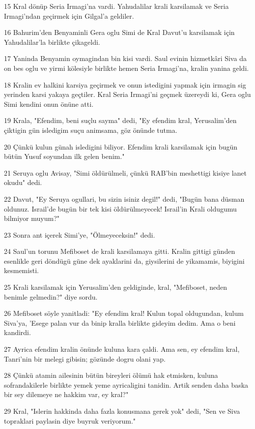 \par 15 Kral dönüp Seria Irmagi'na vardi. Yahudalilar krali karsilamak ve Seria Irmagi'ndan geçirmek için Gilgal'a geldiler.
\par 16 Bahurim'den Benyaminli Gera oglu Simi de Kral Davut'u karsilamak için Yahudalilar'la birlikte çikageldi.
\par 17 Yaninda Benyamin oymagindan bin kisi vardi. Saul evinin hizmetkâri Siva da on bes oglu ve yirmi kölesiyle birlikte hemen Seria Irmagi'na, kralin yanina geldi.
\par 18 Kralin ev halkini karsiya geçirmek ve onun istedigini yapmak için irmagin sig yerinden karsi yakaya geçtiler. Kral Seria Irmagi'ni geçmek üzereydi ki, Gera oglu Simi kendini onun önüne atti.
\par 19 Krala, "Efendim, beni suçlu sayma" dedi, "Ey efendim kral, Yerusalim'den çiktigin gün isledigim suçu animsama, göz önünde tutma.
\par 20 Çünkü kulun günah isledigini biliyor. Efendim krali karsilamak için bugün bütün Yusuf soyundan ilk gelen benim."
\par 21 Seruya oglu Avisay, "Simi öldürülmeli, çünkü RAB'bin meshettigi kisiye lanet okudu" dedi.
\par 22 Davut, "Ey Seruya ogullari, bu sizin isiniz degil!" dedi, "Bugün bana düsman oldunuz. Israil'de bugün bir tek kisi öldürülmeyecek! Israil'in Krali oldugumu bilmiyor muyum?"
\par 23 Sonra ant içerek Simi'ye, "Ölmeyeceksin!" dedi.
\par 24 Saul'un torunu Mefiboset de krali karsilamaya gitti. Kralin gittigi günden esenlikle geri döndügü güne dek ayaklarini da, giysilerini de yikamamis, biyigini kesmemisti.
\par 25 Krali karsilamak için Yerusalim'den geldiginde, kral, "Mefiboset, neden benimle gelmedin?" diye sordu.
\par 26 Mefiboset söyle yanitladi: "Ey efendim kral! Kulun topal oldugundan, kulum Siva'ya, 'Esege palan vur da binip kralla birlikte gideyim dedim. Ama o beni kandirdi.
\par 27 Ayrica efendim kralin önünde kuluna kara çaldi. Ama sen, ey efendim kral, Tanri'nin bir melegi gibisin; gözünde dogru olani yap.
\par 28 Çünkü atamin ailesinin bütün bireyleri ölümü hak etmisken, kuluna sofrandakilerle birlikte yemek yeme ayricaligini tanidin. Artik senden daha baska bir sey dilemeye ne hakkim var, ey kral?"
\par 29 Kral, "Islerin hakkinda daha fazla konusmana gerek yok" dedi, "Sen ve Siva topraklari paylasin diye buyruk veriyorum."
